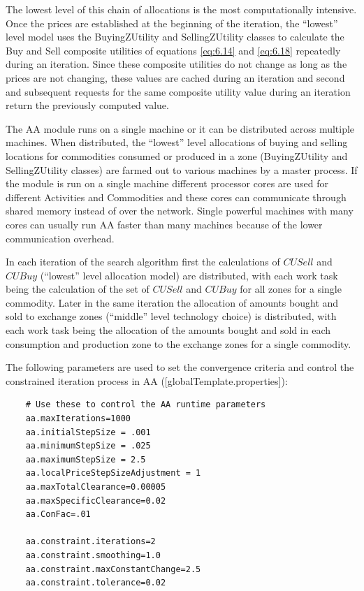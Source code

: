 The lowest level of this chain of allocations is the most computationally intensive. Once the prices are established at the beginning of the iteration, the ``lowest'' level model uses the BuyingZUtility and SellingZUtility classes to calculate the Buy and Sell composite utilities of equations \ref{eq:6.14} and \ref{eq:6.18} repeatedly during an iteration. Since these composite utilities do not change as long as the prices are not changing, these values are cached during an iteration and second and subsequent requests for the same composite utility value during an iteration return the previously computed value.

The AA module runs on a single machine or it can be distributed across multiple machines. When distributed, the ``lowest'' level allocations of buying and selling locations for commodities consumed or produced in a zone (BuyingZUtility and SellingZUtility classes) are farmed out to various machines by a master process. If the module is run on a single machine different processor cores are used for different Activities and Commodities and these cores can communicate through shared memory instead of over the network. Single powerful machines with many cores can usually run AA faster than many machines because of the lower communication overhead.

In each iteration of the search algorithm first the calculations of $CUSell$ and $CUBuy$ (``lowest'' level allocation model) are distributed, with each work task being the calculation of the set of $CUSell$ and $CUBuy$ for all zones for a single commodity. Later in the same iteration the allocation of amounts bought and sold to exchange zones (``middle'' level technology choice) is distributed, with each work task being the allocation of the amounts bought and sold in each consumption and production zone to the exchange zones for a single commodity. 

The following parameters are used to set the convergence criteria and control the constrained iteration process in AA ([globalTemplate.properties]):

{\small
\begin{verbatim}
    # Use these to control the AA runtime parameters
    aa.maxIterations=1000
    aa.initialStepSize = .001
    aa.minimumStepSize = .025 
    aa.maximumStepSize = 2.5
    aa.localPriceStepSizeAdjustment = 1
    aa.maxTotalClearance=0.00005
    aa.maxSpecificClearance=0.02
    aa.ConFac=.01

    aa.constraint.iterations=2
    aa.constraint.smoothing=1.0
    aa.constraint.maxConstantChange=2.5
    aa.constraint.tolerance=0.02
\end{verbatim}
}

